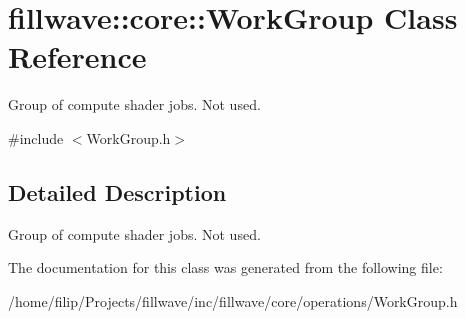 \hypertarget{classfillwave_1_1core_1_1WorkGroup}{}\section{fillwave\+:\+:core\+:\+:Work\+Group Class Reference}
\label{classfillwave_1_1core_1_1WorkGroup}


Group of compute shader jobs. Not used.  




{\ttfamily \#include $<$Work\+Group.\+h$>$}



\subsection{Detailed Description}
Group of compute shader jobs. Not used. 

The documentation for this class was generated from the following file\+:\begin{DoxyCompactItemize}
\item 
/home/filip/\+Projects/fillwave/inc/fillwave/core/operations/Work\+Group.\+h\end{DoxyCompactItemize}
